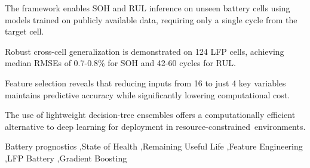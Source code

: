 \documentclass[preprint,12pt]{elsarticle}
\begin{document}
\begin{frontmatter}
\begin{abstract}
\end{abstract}


\begin{highlights}
\item The framework enables SOH and RUL inference on unseen battery cells using models trained on publicly available data, requiring only a single cycle from the target cell.
\item Robust cross-cell generalization is demonstrated on 124 LFP cells, achieving median RMSEs of 0.7-0.8\% for SOH and 42-60 cycles for RUL.
\item Feature selection reveals that reducing inputs from 16 to just 4 key variables maintains predictive accuracy while significantly lowering computational cost.
\item The use of lightweight decision-tree ensembles offers a computationally efficient alternative to deep learning for deployment in resource-constrained environments.
\end{highlights}

\begin{keyword} %
Battery prognostics \sep State of Health \sep Remaining Useful Life \sep Feature Engineering \sep LFP Battery \sep Gradient Boosting

\end{keyword}

\end{frontmatter}
\end{document}

